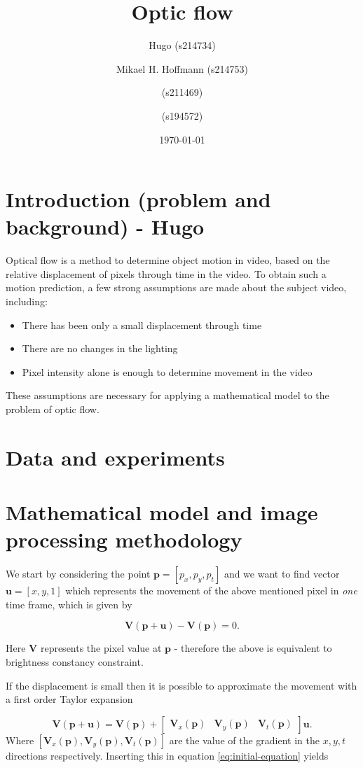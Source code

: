 \documentclass{article}
\title{Optic flow}
\author{Hugo (s214734) \and Mikael H. Hoffmann (s214753) \and (s211469) \and (s194572)}
\date{\today}
\begin{document}
\maketitle

\section{Introduction (problem and background) - Hugo}
Optical flow is a method to determine object motion in video, based on the relative displacement of pixels
through time in the video. To obtain such a motion prediction, a few strong assumptions are made
about the subject video, including:
\begin{itemize}
    \item There has been only a small displacement through time
    \item There are no changes in the lighting
    \item Pixel intensity alone is enough to determine movement in the video
\end{itemize}
These assumptions are necessary for applying a mathematical model to the problem of optic flow.

\section{Data and experiments}




\section{Mathematical model and image processing methodology}
We start by considering the point $\boldsymbol{p} = [p_x, p_y, p_t]$ and we want to find vector $\boldsymbol{u} = [x, y, 1]$ which represents the movement of the above mentioned pixel in \emph{one} time frame, which is given by

\begin{equation}\label{eq:initial-equation}
    \boldsymbol{V(p + u)} - \boldsymbol{V(p)} = 0.
\end{equation}

Here $\boldsymbol{V}$ represents the pixel value at $\boldsymbol{p}$ - therefore the above is equivalent to brightness constancy constraint. 

If the displacement is small then it is possible to  approximate the movement with a first order Taylor expansion

\begin{equation}
    \boldsymbol{V(p + u)} = \boldsymbol{V(p)} + \begin{bmatrix}
        \boldsymbol{V}_x(\boldsymbol{p}) & \boldsymbol{V}_y(\boldsymbol{p}) & \boldsymbol{V}_t(\boldsymbol{p})
    \end{bmatrix} \boldsymbol{u}.
\end{equation}
Where $[\boldsymbol{V}_x(\boldsymbol{p}),\boldsymbol{V}_y(\boldsymbol{p}),\boldsymbol{V}_t(\boldsymbol{p})]$ are the value of the gradient in the $x,y,t$ directions respectively. Inserting this in equation \ref{eq:initial-equation} yields
\end{document}
